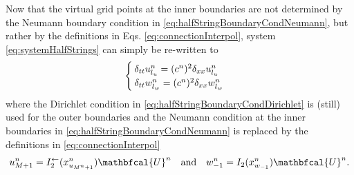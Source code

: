 \SWcomment[***$\rightarrow$]Now that the virtual grid points at the inner boundaries are not determined by the Neumann boundary condition in \eqref{eq:halfStringBoundaryCondNeumann}, but rather by the definitions in Eqs. \eqref{eq:connectionInterpol}, system \eqref{eq:systemHalfStrings} can simply be re-written to
\begin{equation}\label{eq:FDSwithMethod}
    \begin{cases}
        \delta_{tt}u_{l_u}^n = (c^n)^2\delta_{xx}u_{l_u}^n\\
        \delta_{tt}w_{l_w}^n = (c^n)^2\delta_{xx}w_{l_w}^n
    \end{cases}
\end{equation}
where the Dirichlet condition in \eqref{eq:halfStringBoundaryCondDirichlet} is (still) used for the outer boundaries and the Neumann condition at the inner boundaries in \eqref{eq:halfStringBoundaryCondNeumann} is replaced by the definitions in \eqref{eq:connectionInterpol}
\begin{equation}
        u_{M+1}^n = I_2^\flip(x_{u_{M^n+1}}^n)\mathbfcal{U}^n \quad \text{and}\quad w_{-1}^n = I_2(x_{w_{-1}}^n)\mathbfcal{U}^n.
\end{equation}
\SWcomment[$\leftarrow$***]

